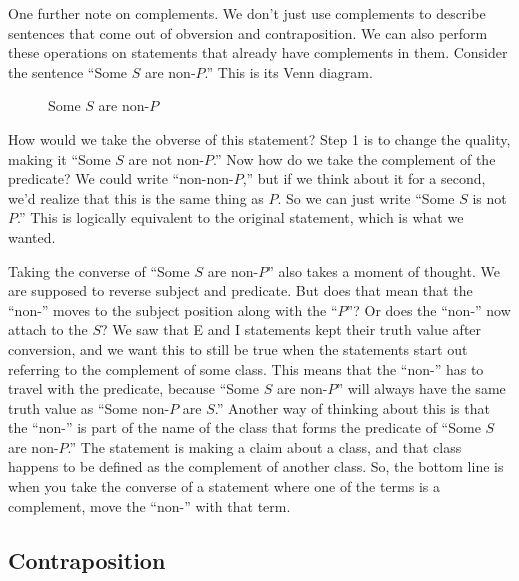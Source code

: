 One further note on complements. We don't just use complements to describe sentences that come out of obversion and contraposition. We can also perform these operations on statements that already have complements in them. Consider the sentence ``Some $S$ are non-$P$.'' This is its Venn diagram.

\begin{figure}[H]
\begin{center}
\captionsetup{singlelinecheck=on}
\caption*{Some $S$ are non-$P$}
\end{center}
\end{figure}

How would we take the obverse of this statement? Step 1 is to change the quality, making it ``Some $S$ are not non-$P$.'' Now how do we take the complement of the predicate? We could write ``non-non-$P$,'' but if we think about it for a second, we'd realize that this is the same thing as $P$. So we can just write ``Some $S$ is not $P$.'' This is logically equivalent to the original statement, which is what we wanted.

Taking the converse of ``Some $S$ are non-$P$'' also takes a moment of thought. We are supposed to reverse subject and predicate. But does that mean that the ``non-'' moves to the subject position along with the ``$P$''? Or does the ``non-'' now attach to the $S$? We saw that E and I statements kept their truth value after conversion, and we want this to still be true when the statements start out referring to the complement of some class. This means that the ``non-'' has to travel with the predicate, because ``Some $S$ are non-$P$'' will always have the same truth value as ``Some non-$P$ are $S$.'' Another way of thinking about this is that the ``non-'' is part of the name of the class that forms the predicate of ``Some $S$ are non-$P$.'' The statement is making a claim about a class, and that class happens to be defined as the complement of another class. So, the bottom line is when you take the converse of a statement where one of the terms is a complement, move the ``non-'' with that term.

\subsection{Contraposition}

